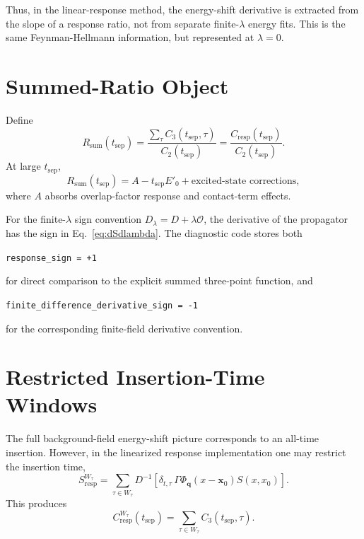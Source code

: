 \documentclass[11pt,a4paper]{article}
\newcommand{\Dslash}{D}
\newcommand{\Sresp}{S_{\mathrm{resp}}}
\newcommand{\Ocur}{\mathcal{O}}
\newcommand{\Ctwo}{C_2}
\newcommand{\Cthree}{C_3}
\newcommand{\Cresp}{C_{\mathrm{resp}}}
\newcommand{\Rsum}{R_{\mathrm{sum}}}
\begin{document}
Thus, in the linear-response method, the energy-shift derivative is extracted
from the slope of a response ratio, not from separate finite-\(\lambda\) energy
fits.  This is the same Feynman-Hellmann information, but represented at
\(\lambda=0\).

\section{Summed-Ratio Object}

Define
\begin{equation}
  \Rsum(t_{\mathrm{sep}})
  =
  \frac{
    \sum_\tau \Cthree(t_{\mathrm{sep}},\tau)
  }{
    \Ctwo(t_{\mathrm{sep}})
  }
  =
  \frac{
    \Cresp(t_{\mathrm{sep}})
  }{
    \Ctwo(t_{\mathrm{sep}})
  }.
\end{equation}
At large \(t_{\mathrm{sep}}\),
\begin{equation}
  \Rsum(t_{\mathrm{sep}})
  =
  A - t_{\mathrm{sep}} E'_0
  + \text{excited-state corrections},
\label{eq:summed_ratio_slope}
\end{equation}
where \(A\) absorbs overlap-factor response and contact-term effects.

For the finite-\(\lambda\) sign convention
\(\Dslash_\lambda=\Dslash+\lambda\Ocur\), the derivative of the propagator has
the sign in Eq.~\eqref{eq:dSdlambda}.  The diagnostic code stores both
\begin{center}
\texttt{response\_sign = +1}
\end{center}
for direct comparison to the explicit summed three-point function, and
\begin{center}
\texttt{finite\_difference\_derivative\_sign = -1}
\end{center}
for the corresponding finite-field derivative convention.

\section{Restricted Insertion-Time Windows}

The full background-field energy-shift picture corresponds to an all-time
insertion.  However, in the linearized response implementation one may restrict
the insertion time,
\begin{equation}
  \Sresp^{W_\tau}
  =
  \sum_{\tau\in W_\tau}
  \Dslash^{-1}
  \left[
    \delta_{t,\tau}\,
    \Gamma\Phi_{\mathbf q}(x-\mathbf x_0)S(x,x_0)
  \right].
\end{equation}
This produces
\begin{equation}
  \Cresp^{W_\tau}(t_{\mathrm{sep}})
  =
  \sum_{\tau\in W_\tau}
  \Cthree(t_{\mathrm{sep}},\tau).
\end{equation}
\end{document}
